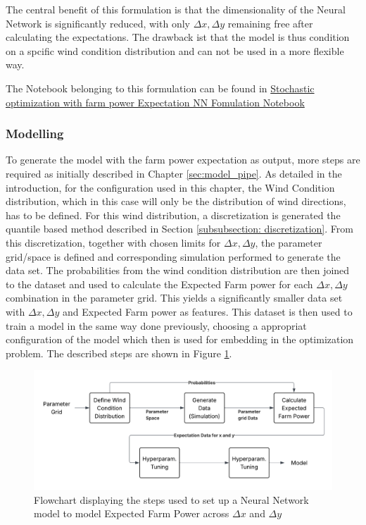 The central benefit of this formulation is that the dimensionality of the Neural Network is significantly reduced, with only  \(\Delta x, \Delta y\) remaining free after calculating the expectations. The drawback ist that the model is thus condition on a spcific wind condition distribution and can not be used in a more flexible way.


The Notebook belonging to this formulation can be found in \href{https://github.com/schmeti/uc3m_TFM_wind_farm_optimization_codebase/blob/main/Windfarm_power_modelling/0_two_turbine_problem_constrLearn_probweightedt_expNN.ipynb}{Stochastic optimization with farm power Expectation NN Fomulation Notebook} \cite{schmetz2025twoturbine_stoch2}

\subsubsection{Modelling}

To generate the model with the farm power expectation as output, more steps are required as initially described in Chapter \ref{sec:model_pipe}. As detailed in the introduction, for the configuration used in this chapter, the Wind Condition distribution, which in this case will only be the distribution of wind directions, has to be defined. For this wind distribution, a discretization is generated the quantile based method described in Section \ref{subsubsection: discretization}. From this discretization, together with chosen limits for \(\Delta x, \Delta y\), the parameter grid/space is defined and corresponding simulation performed to generate the data set. The probabilities from the wind condition distribution are then joined to the dataset and used to calculate the Expected Farm power for each \(\Delta x, \Delta y\) combination in the parameter grid. This yields a significantly smaller data set with \(\Delta x, \Delta y\) and Expected Farm power as features. This dataset is then used to train a model in the same way done previously, choosing a appropriat configuration of the model which then is used for embedding in the optimization problem. The described steps are shown in Figure \ref{fig:stoch2_model_flow}.


\begin{figure}[h] 
	\centering
	\includegraphics[width=1\textwidth]{figures/optimization/stoch2/stoch2_model_flow.png} 
	\caption{Flowchart displaying the steps used to set up a Neural Network model to model Expected Farm Power across \(\Delta x\) and  \(\Delta y\)}
	\label{fig:stoch2_model_flow}
\end{figure} 


